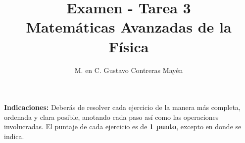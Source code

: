 
\usepackage{apacite}
\title{Examen - Tarea 3 \\[0.3em]  \large{Matemáticas Avanzadas de la Física}\vspace{-3ex}}
\author{M. en C. Gustavo Contreras Mayén}
\date{ }

\vspace{-4cm}
\maketitle
\fontsize{14}{14}\selectfont

\textbf{Indicaciones: } Deberás de resolver cada ejercicio de la manera más completa, ordenada y clara posible, anotando cada paso así como las operaciones involucradas. El puntaje de cada ejercicio es de \textbf{1 punto}, excepto en donde se indica.

